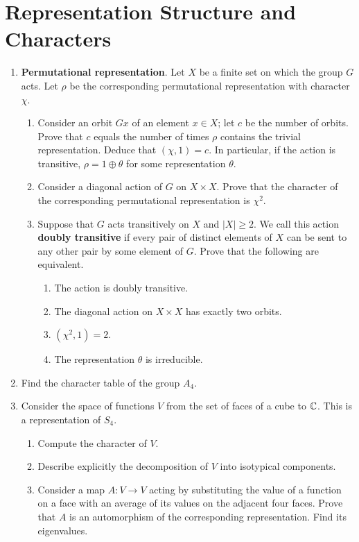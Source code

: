 \documentclass[../psets.tex]{subfiles}
\begin{document}
\section{Representation Structure and Characters}
\begin{enumerate}
    \item {}\textbf{Permutational representation}. Let $X$ be a finite set on which the group $G$ acts. Let $\rho$ be the corresponding permutational representation with character $\chi$.
    \begin{enumerate}
        \item Consider an orbit $Gx$ of an element $x\in X$; let $c$ be the number of orbits. Prove that $c$ equals the number of times $\rho$ contains the trivial representation. Deduce that $(\chi,1)=c$. In particular, if the action is transitive, $\rho=1\oplus\theta$ for some representation $\theta$.
        \item Consider a diagonal action of $G$ on $X\times X$. Prove that the character of the corresponding permutational representation is $\chi^2$.
        \item Suppose that $G$ acts transitively on $X$ and $|X|\geq 2$. We call this action \textbf{doubly transitive} if every pair of distinct elements of $X$ can be sent to any other pair by some element of $G$. Prove that the following are equivalent.
        \begin{enumerate}
            \item The action is doubly transitive.
            \item The diagonal action on $X\times X$ has exactly two orbits.
            \item $(\chi^2,1)=2$.
            \item The representation $\theta$ is irreducible.
        \end{enumerate}
    \end{enumerate}
    \item Find the character table of the group $A_4$.
    \item Consider the space of functions $V$ from the set of faces of a cube to $\mathbb{C}$. This is a representation of $S_4$.
    \begin{enumerate}
        \item Compute the character of $V$.
        \item Describe explicitly the decomposition of $V$ into isotypical components.
        \item Consider a map $A:V\to V$ acting by substituting the value of a function on a face with an average of its values on the adjacent four faces. Prove that $A$ is an automorphism of the corresponding representation. Find its eigenvalues.

\end{enumerate}
\end{enumerate}
\end{document}
